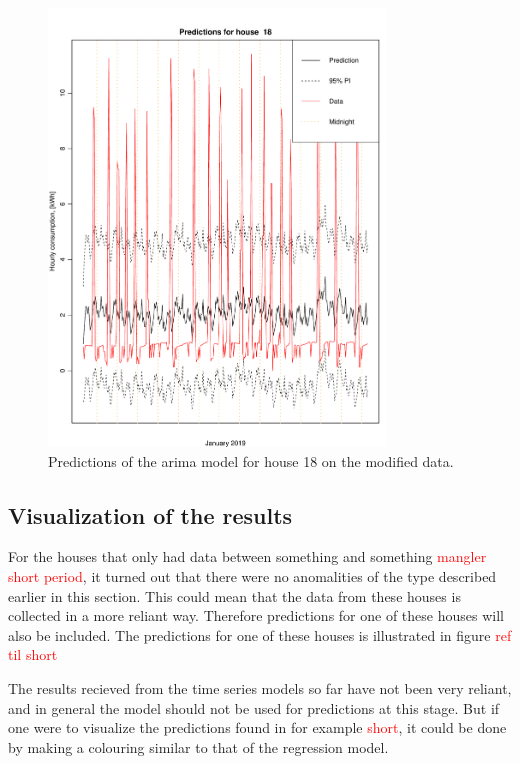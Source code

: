 \begin{figure}
    \centering
    \includegraphics[width=0.8\textwidth]{../../../figures/arimax/arima2_pred_18.pdf}
    \caption{Predictions of the arima model for house 18 on the modified data.}
    \label{fig:arima1_pred_18}
\end{figure}



\subsection{Visualization of the results}
For the houses that only had data between something and something \textcolor{red}{mangler short period}, it turned out that there were no anomalities of the type described earlier in this section. This could mean that the data from these houses is collected in a more reliant way. Therefore predictions for one of these houses will also be included. The predictions for one of these houses is illustrated in figure \textcolor{red}{ref til short}


\noindent The results recieved from the time series models so far have not been very reliant, and in general the model should not be used for predictions at this stage. But if one were to visualize the predictions found in for example \textcolor{red}{short}, it could be done by making a colouring similar to that of the regression model.


